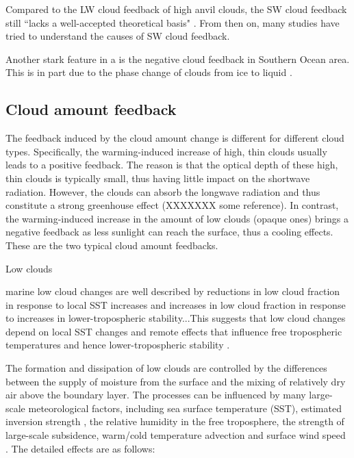 Compared to the LW cloud feedback of high anvil clouds, the SW cloud feedback still ``lacks a well-accepted theoretical basis" \citep{stocker2013climate}. From then on, many studies have tried to understand the causes of SW cloud feedback. 

Another stark feature in a is the negative cloud feedback in Southern Ocean area. This is in part due to the phase change of clouds from ice to liquid \citep{Kay2014processes}.

\subsection{Cloud amount feedback}
The feedback induced by the cloud amount change is different for different cloud types. Specifically, the warming-induced increase of high, thin clouds usually leads to a positive feedback. The reason is that the optical depth of these high, thin clouds is typically small, thus having little impact on the shortwave radiation. However, the clouds can absorb the longwave radiation and thus constitute a strong greenhouse effect (XXXXXXX some reference). In contrast, the warming-induced increase in the amount of low clouds (opaque ones) brings a negative feedback as less sunlight can reach the surface, thus a cooling effects. These are the two typical cloud amount feedbacks.

Low clouds

marine low cloud changes are well described by reductions in low cloud fraction in response to local SST increases \citep[e.g.,][]{Rieck2012, Webb2013coupling, Qu2014, Bretherton2015, Brient2016,Ceppi2017relationship} and increases in low cloud fraction in response to increases in lower-tropospheric stability...This suggests that low cloud changes depend on local SST changes and remote effects that influence free tropospheric temperatures and hence lower-tropospheric stability \citep[e.g.,][]{Zhou2015,Zhou2016,Zhou2017,Andrews2018}. 

The formation and dissipation of low clouds are controlled by the differences between the supply of moisture from the surface and the mixing of relatively dry air above the boundary layer. The processes can be influenced by many large-scale meteorological factors, including sea surface temperature (SST), estimated inversion strength \citep[EIS;][]{Wood2006}, the relative humidity in the free troposphere, the strength of large-scale subsidence, warm/cold temperature advection and surface wind speed \citep{Scott2020}. The detailed effects are as follows:

